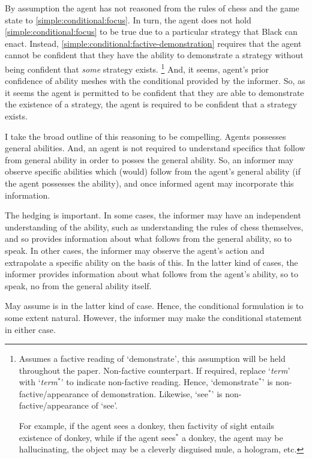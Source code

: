 \documentclass[10pt]{article}
\newcommand{\nf}[1]{#1\ensuremath{^{{*}}}}
\begin{document}
By assumption the agent has not reasoned from the rules of chess and the game state to \ref{simple:conditional:focus}.
In turn, the agent does not hold \ref{simple:conditional:focus} to be true due to a particular strategy that Black can enact.
Instead, \ref{simple:conditional:factive-demonstration} requires that the agent cannot be confident that they have the ability to demonstrate a strategy without being confident that \emph{some} strategy exists.\nolinebreak
\footnote{
  Assumes a factive reading of `demonstrate', this assumption will be held throughout the paper.
  Non-factive counterpart.
  If required, replace `\emph{term}' with `\nf{\emph{term}}' to indicate non-factive reading.
  Hence, `\nf{demonstrate}' is non-factive/appearance of demonstration.
  Likewise, `\nf{see}' is non-factive/appearance of `see'.

  For example, if the agent sees a donkey, then factivity of sight entails existence of donkey, while if the agent \nf{sees} a donkey, the agent may be hallucinating, the object may be a cleverly disguised mule, a hologram, etc.
}
And, it seems, agent's prior confidence of ability meshes with the conditional provided by the informer.
So, as it seems the agent is permitted to be confident that they are able to demonstrate the existence of a strategy, the agent is required to be confident that a strategy exists.

I take the broad outline of this reasoning to be compelling.
Agents possesses general abilities.
And, an agent is not required to understand specifics that follow from general ability in order to posses the general ability.
So, an informer may observe specific abilities which (would) follow from the agent's general ability (if the agent possesses the ability), and once informed agent may incorporate this information.

The hedging is important.
In some cases, the informer may have an independent understanding of the ability, such as understanding the rules of chess themselves, and so provides information about what follows from the general ability, so to speak.
In other cases, the informer may observe the agent's action and extrapolate a specific ability on the basis of this.
In the latter kind of cases, the informer provides information about what follows from the agent's ability, so to speak, no from the general ability itself.

May assume is in the latter kind of case.
Hence, the conditional formulation is to some extent natural.
However, the informer may make the conditional statement in either case.
\end{document}
